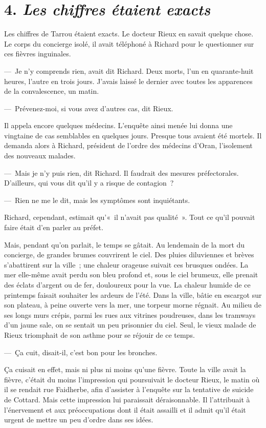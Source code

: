 \documentclass[french,twoside]{book} %
\begin{document}
\section[{4. Les chiffres étaient exacts}]{4. \emph{Les chiffres étaient exacts}}
\noindent Les chiffres de Tarrou étaient exacts. Le docteur Rieux en savait quelque chose. Le corps du concierge isolé, il avait téléphoné à Richard pour le questionner sur ces fièvres inguinales.\par
— Je n’y comprends rien, avait dit Richard. Deux morts, l’un en quarante-huit heures, l’autre en trois jours. J’avais laissé le dernier avec toutes les apparences de la convalescence, un matin.\par
— Prévenez-moi, si vous avez d’autres cas, dit Rieux.\par
Il appela encore quelques médecins. L’enquête ainsi menée lui donna une vingtaine de cas semblables en quelques jours. Presque tous avaient été mortels. Il demanda alors à Richard, président de l’ordre des médecins d’Oran, l’isolement des nouveaux malades.\par
— Mais je n’y puis rien, dit Richard. Il faudrait des mesures préfectorales. D’ailleurs, qui vous dit qu’il y a risque de contagion ?\par
— Rien ne me le dit, mais les symptômes sont inquiétants.\par
Richard, cependant, estimait qu’« il n’avait pas qualité ». Tout ce qu’il pouvait faire était d’en parler au préfet.\par
Mais, pendant qu’on parlait, le temps se gâtait. Au lendemain de la mort du concierge, de grandes brumes couvrirent le ciel. Des pluies diluviennes et brèves s’abattirent sur la ville ; une chaleur orageuse suivait ces brusques ondées. La mer elle-même avait perdu son bleu profond et, sous le ciel brumeux, elle prenait des éclats d’argent ou de fer, douloureux pour la vue. La chaleur humide de ce printemps faisait souhaiter les ardeurs de l’été. Dans la ville, bâtie en escargot sur son plateau, à peine ouverte vers la mer, une torpeur morne régnait. Au milieu de ses longs murs crépis, parmi les rues aux vitrines poudreuses, dans les tramways d’un jaune sale, on se sentait un peu prisonnier du ciel. Seul, le vieux malade de Rieux triomphait de son asthme pour se réjouir de ce temps.\par
— Ça cuit, disait-il, c’est bon pour les bronches.\par
Ça cuisait en effet, mais ni plus ni moins qu’une fièvre. Toute la ville avait la fièvre, c’était du moins l’impression qui poursuivait le docteur Rieux, le matin où il se rendait rue Faidherbe, afin d’assister à l’enquête sur la tentative de suicide de Cottard. Mais cette impression lui paraissait déraisonnable. Il l’attribuait à l’énervement et aux préoccupations dont il était assailli et il admit qu’il était urgent de mettre un peu d’ordre dans ses idées.\par
\end{document}
